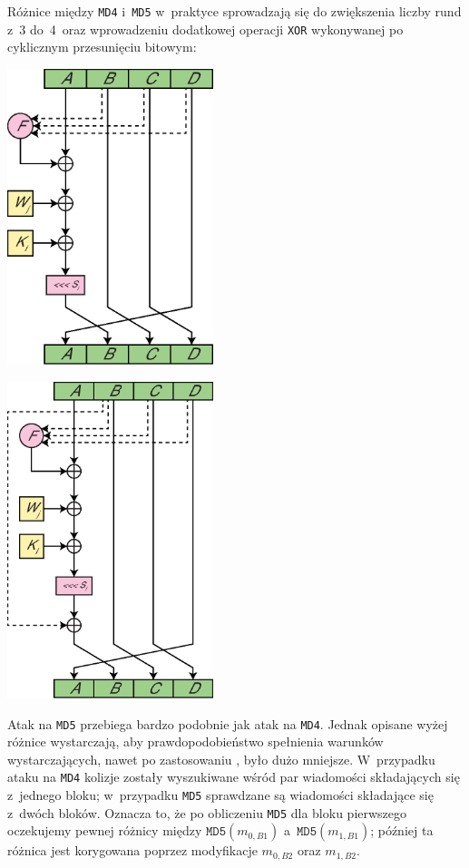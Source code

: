 \documentclass[12pt,a4paper,twoside]{article}
\begin{document}
Różnice między \texttt{MD4} i~\texttt{MD5} w~praktyce sprowadzają się do
zwiększenia liczby rund z~3 do~4~oraz wprowadzeniu dodatkowej operacji
\texttt{XOR} wykonywanej po cyklicznym przesunięciu bitowym:
\begin{multicols}{2}
\begingroup
    \centering
    \includegraphics[width=6cm]{img/md4_operation.eps}
    \label{fig:md4_operation}
\endgroup

\begingroup
    \centering
    \includegraphics[width=6cm]{img/md5_operation.eps}
    \label{fig:md5_operation}
\endgroup
\end{multicols}


Atak na \texttt{MD5} przebiega bardzo podobnie jak atak na \texttt{MD4}. Jednak
opisane wyżej różnice wystarczają, aby prawdopodobieństwo spełnienia warunków
wystarczających, nawet po zastosowaniu , było
dużo mniejsze. W~przypadku ataku na \texttt{MD4} kolizje zostały wyszukiwane
wśród par wiadomości składających się z~jednego bloku; w~przypadku \texttt{MD5}
sprawdzane są wiadomości składające się z~dwóch bloków. Oznacza to, że po
obliczeniu \texttt{MD5} dla bloku pierwszego oczekujemy pewnej różnicy między
$\mathtt{MD5}(m_{0,B1})$ a~$\mathtt{MD5}(m_{1,B1})$; później ta różnica jest
korygowana poprzez modyfikacje $m_{0,B2}$ oraz $m_{1,B2}$.
\end{document}
